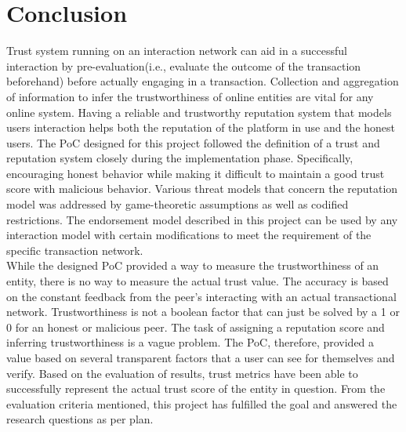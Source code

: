 \chapter{Conclusion} \label{ch:conclusion}
Trust system running on an interaction network can aid in a successful
interaction by pre-evaluation(i.e., evaluate the outcome of the transaction
beforehand) before actually engaging in a transaction. Collection and
aggregation of information to infer the trustworthiness of online entities are
vital for any online system. Having a reliable and trustworthy reputation
system that models users interaction helps both the reputation of the platform
in use and the honest users. The PoC designed for this project followed the
definition of a trust and reputation system closely during the implementation
phase. Specifically, encouraging honest behavior while making it difficult to
maintain a good trust score with malicious behavior. Various threat models that
concern the reputation model was addressed by game-theoretic assumptions as
well as codified restrictions. The endorsement model described in this project
can be used by any interaction model with certain modifications to meet the
requirement of the specific transaction network.\\

While the designed PoC provided a way to measure the trustworthiness of an
entity, there is no way to measure the actual trust value. The accuracy is
based on the constant feedback from the peer's interacting with an actual
transactional network. Trustworthiness is not a boolean factor that can just be
solved by a 1 or 0 for an honest or malicious peer. The task of assigning a
reputation score and inferring trustworthiness is a vague problem. The PoC,
therefore, provided a value based on several transparent factors that a user
can see for themselves and verify. Based on the evaluation of results, trust
metrics have been able to successfully represent the actual trust score of the
entity in question. From the evaluation criteria mentioned, this project has
fulfilled the goal and answered the research questions as per plan.

